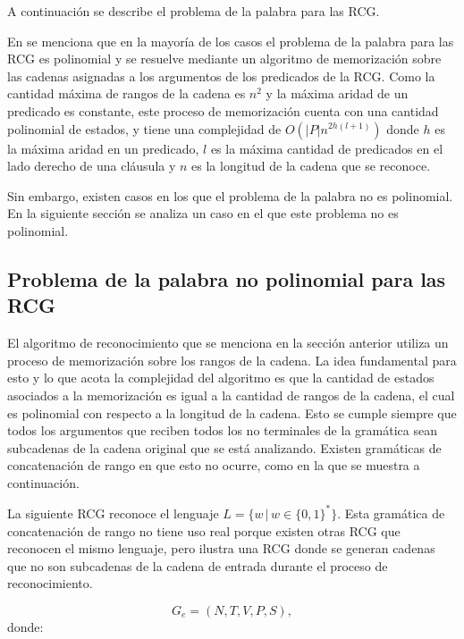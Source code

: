 A continuación se describe el problema de la palabra para las RCG.


En \cite{mainRCGBib} se menciona que en la mayoría de los casos el problema de la palabra para las RCG es polinomial y se resuelve mediante un algoritmo de memorización sobre las cadenas asignadas a los argumentos de los predicados de la RCG.  Como la cantidad máxima de rangos de la cadena es $n^2$ y la máxima aridad de un predicado es constante, este proceso de memorización cuenta con una cantidad polinomial de estados, y tiene una complejidad de $O(|P|n^{2h(l+1)})$ donde $h$ es la máxima aridad en un predicado, $l$ es la máxima cantidad de predicados en el lado derecho de una cláusula y $n$ es la longitud de la cadena que se reconoce.

Sin embargo, existen casos en los que el problema de la palabra no es polinomial. En la siguiente sección se analiza un caso en el que este problema no es polinomial.

\subsection{Problema de la palabra no polinomial para las RCG}

El algoritmo de reconocimiento que se menciona en la sección anterior utiliza un proceso de memorización sobre los rangos de la cadena.  La idea fundamental para esto y lo que acota la complejidad del algoritmo es que la cantidad de estados asociados a la memorización es igual a la cantidad de rangos de la cadena, el cual es polinomial con respecto a la longitud de la cadena. Esto se cumple siempre que todos los argumentos que reciben todos los no terminales de la gramática sean subcadenas de la cadena original que se está analizando. Existen gramáticas de concatenación de rango en que esto no ocurre, como en la que se muestra a continuación.

La siguiente RCG reconoce el lenguaje $L=\{w\,|\,w\in\{0,1\}^*\}$. Esta gramática de concatenación de rango no tiene uso real porque existen otras RCG que reconocen el mismo lenguaje, pero ilustra una RCG donde se generan cadenas que no son subcadenas de la cadena de entrada durante el proceso de reconocimiento.

\[
    G_e = (N, T, V, P, S),
\]
donde:

